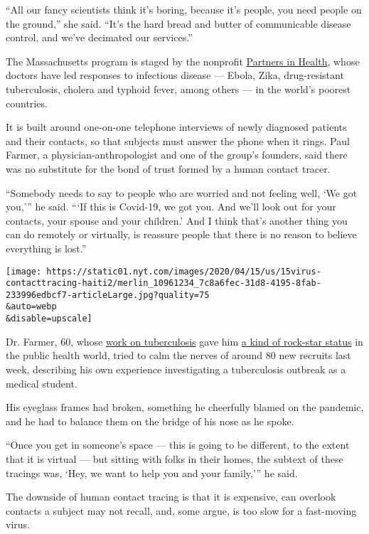 ``All our fancy scientists think it's boring, because it's people, you
need people on the ground,'' she said. ``It's the hard bread and butter
of communicable disease control, and we've decimated our services.''

The Massachusetts program is staged by the nonprofit
\href{https://www.pih.org/}{Partners in Health}, whose doctors have led
responses to infectious disease --- Ebola, Zika, drug-resistant
tuberculosis, cholera and typhoid fever, among others --- in the world's
poorest countries.

It is built around one-on-one telephone interviews of newly diagnosed
patients and their contacts, so that subjects must answer the phone when
it rings. Paul Farmer, a physician-anthropologist and one of the group's
founders, said there was no substitute for the bond of trust formed by a
human contact tracer.

``Somebody needs to say to people who are worried and not feeling well,
`We got you,''' he said. ```If this is Covid-19, we got you. And we'll
look out for your contacts, your spouse and your children.' And I think
that's another thing you can do remotely or virtually, is reassure
people that there is no reason to believe everything is lost.''

\texttt{[image: https://static01.nyt.com/images/2020/04/15/us/15virus-contacttracing-haiti2/merlin\_10961234\_7c8a6fec-31d8-4195-8fab-233996edbcf7-articleLarge.jpg?quality=75\\\&auto=webp\\\&disable=upscale]}

Dr. Farmer, 60, whose
\href{https://www.nytimes.com/2017/10/05/movies/bending-the-arc-review-paul-farmer-partners-in-health.html}{work
on tuberculosis} gave him
\href{https://www.nytimes.com/2003/09/14/books/a-season-in-hell.html}{a
kind of rock-star status} in the public health world, tried to calm the
nerves of around 80 new recruits last week, describing his own
experience investigating a tuberculosis outbreak as a medical student.

His eyeglass frames had broken, something he cheerfully blamed on the
pandemic, and he had to balance them on the bridge of his nose as he
spoke.

``Once you get in someone's space --- this is going to be different, to
the extent that it is virtual --- but sitting with folks in their homes,
the subtext of these tracings was, `Hey, we want to help you and your
family,''' he said.

The downside of human contact tracing is that it is expensive, can
overlook contacts a subject may not recall, and, some argue, is too slow
for a fast-moving virus.


